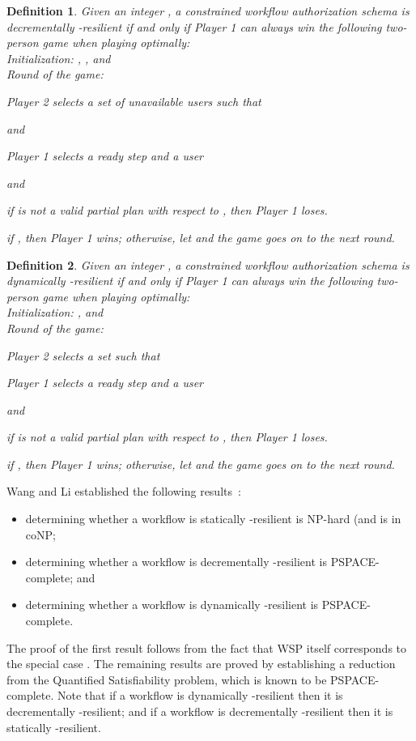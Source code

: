 \documentclass[jcs,crcready]{iosart1c}
\newtheorem{df}{Definition}
\begin{document}
\begin{df} \label{def:decrres}
Given an integer , a constrained workflow authorization schema  is {\em decrementally -resilient} if and only if Player 1 can always win the following two-person game when playing optimally:\\
Initialization: , ,  and \\
Round  of the game:
\begin{compactenum}
	\item Player 2 selects a set of unavailable users  such that 
	
	 and 
	\item Player 1 selects a ready step  and a user 
	
	 and 
	
	if  is not a valid partial plan with respect to , then Player 1 loses.
	\item if , then Player 1 wins; otherwise, let  and the game goes on to the next round.
\end{compactenum}
\end{df}



\begin{df}\label{def:dynres}
Given an integer , a constrained workflow authorization schema  is {\em dynamically -resilient} if and only if Player 1 can always win the following two-person game when playing optimally:\\
Initialization: , and \\
Round  of the game:
\begin{compactenum}
	\item Player 2 selects a set  such that 
	
	
	\item Player 1 selects a ready step  and a user 
	
	 and 
	
	if  is not a valid partial plan with respect to , then Player 1 loses.
	\item if , then Player 1 wins; otherwise, let  and the game goes on to the next round.
\end{compactenum}
\end{df}

Wang and Li established the following results~\cite[Theorems 13--15]{WaLi10}:
\begin{itemize}
 \item determining whether a workflow is statically -resilient is NP-hard (and is in coNP;
 \item determining whether a workflow is decrementally -resilient is PSPACE-complete; and
 \item determining whether a workflow is dynamically -resilient is PSPACE-complete.
\end{itemize}
The proof of the first result follows from the fact that WSP itself corresponds to the special case .
The remaining results are proved by establishing a reduction from the {\sc Quantified Satisfiability} problem, which is known to be PSPACE-complete.
Note that if a workflow is dynamically -resilient then it is decrementally -resilient; and if a workflow is decrementally -resilient then it is statically -resilient. 
 
\end{document}
